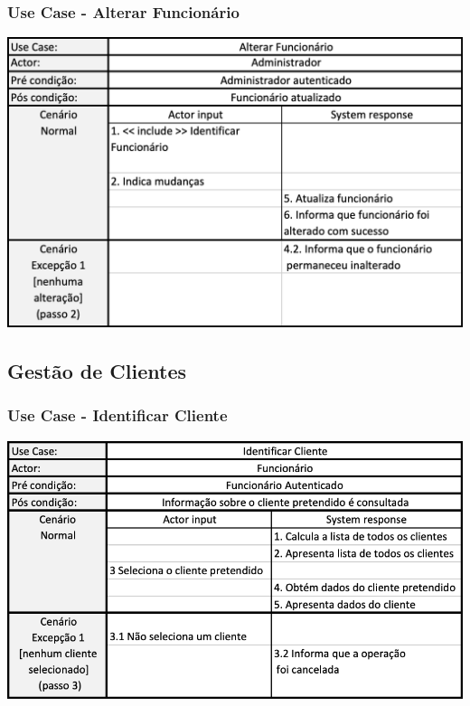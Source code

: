 \subsubsection{Use Case - Alterar Funcionário}
\begin{center}
 	\includegraphics[width = 5.5in]{D_E_USECASE/uc_alterar_funcionario.png}
\end{center}
\subsection{Gestão de Clientes}
\subsubsection{Use Case - Identificar Cliente}
\begin{center}
 	\includegraphics[width = 5.5in]{D_E_USECASE/uc_identificar_cliente.png}
\end{center}
